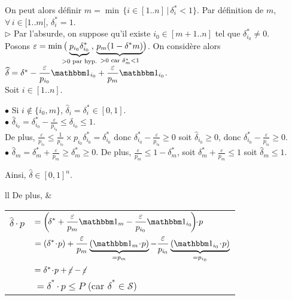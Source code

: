 \documentclass{scrartcl}
\renewcommand{\cal}[1]{\mathcal{#1}}
\newcommand{\dotp}{\! \cdot \!}
\newcommand{\1}{\bbm{1}}
\begin{document}
			On peut alors définir \( m = \min \, \{ i \in [1..n] \, | \, \delta^*_i < 1 \} \).
			Par définition de $m$, \( \forall \, i \in [1..m[, \, \delta^*_i = 1 \).
				\\[3mm]
			$\triangleright$ Par l'absurde, on suppose qu'il existe \( i_0 \in [m+1..n] \) tel que \( \delta^*_{i_0} \neq 0 \). \\
			Posons \( \varepsilon = \min \big( \!\!\!\!\! \underbrace{p_{i_0} \delta^*_{i_0}}_{> 0 \text{ par hyp.}} \!\!\!\! , \, \underbrace{p_m (1 - \delta^*m)}_{> 0 \text{ car } \delta^*_m < 1} \hspace{-0.6mm} \big) \).
			On considère alors \( \widehat{\delta} = \delta^* - \displaystyle \frac{\varepsilon}{p_{i_0}} \1_{i_0} + \frac{\varepsilon}{p_m} \1_{i_0}\).
				\\
			Soit $i \in [1..n]$. \\
			\hspace*{5mm} \parbox{170mm}{
				$\bullet$ Si \( i \notin \{ i_0, m \} \), \( \widehat{\delta}_i = \delta^*_i \in [0, 1] \). \\[1mm]
				$\bullet$ \( \displaystyle \widehat{\delta}_{i_0} = \delta^*_{i_0} - \frac{\varepsilon}{p_{i_0}} \leq \delta_{i_0} \leq 1 \). \\[-1mm]
				De plus, \( \displaystyle \frac{\varepsilon}{p_{i_0}} \leq \frac{1}{p_{i_0}} \times p_{i_0} \delta^*_{i_0} = \delta^*_{i_0}\) donc \( \displaystyle \delta^*_{i_0} - \frac{\varepsilon}{p_{i_0}} \geq 0 \) soit \( \widehat{\delta}_{i_0} \geq 0 \), donc \( \displaystyle \delta^*_{i_0} - \frac{\varepsilon}{p_{i_0}} \geq 0 \). \\[1mm]
				$\bullet$ \(\displaystyle \widehat{\delta}_m = \delta^*_m + \frac{\varepsilon}{p_m} \geq \delta^*_m \geq 0 \). %
				De plus, \( \displaystyle \frac{\varepsilon}{p_m} \leq 1 - \delta^*_m \), soit \( \displaystyle \delta^*_m + \frac{\varepsilon}{p_m} \leq 1 \) soit \( \widehat{\delta}_m \leq 1 \).
			}
			Ainsi, \( \widehat{\delta} \in [0, 1]^n \).
				\\[2.5mm]
			\hspace*{-3.5mm}
				\begin{tabular}[t]{ll}
					De plus, \hspace{-4mm} &
					\begin{tabular}[t]{ll}
						\( \widehat{\delta} \dotp p \) \hspace{-4mm}
						& \( = \displaystyle \left( \! \delta^* + \frac{\varepsilon}{p_m} \1_m - \frac{\varepsilon}{p_{i_0}} \1_{i_0} \! \right) \! \dotp p \) \\
						& \( = \displaystyle (\delta^* \dotp p ) + \frac{\varepsilon}{p_m} \underbrace{(\1_m \dotp p)}_{= p_m} - \frac{\varepsilon}{p_{i_0}} \underbrace{(\1_{i_0} \dotp p)}_{= p_{i_0}} \) \\[-2.5mm]
						& \( = \delta^* \dotp p + \cancel{\varepsilon} - \cancel{\varepsilon} \) \\
						& \( = \delta^* \dotp p \leq P \) \quad (car $\delta^* \in \cal{S}$)
					\end{tabular}
				\end{tabular} \\
\end{document}
